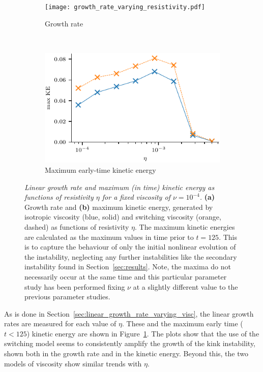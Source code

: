 \begin{figure}[t]
    \centering
    \begin{subfigure}[t]{0.5\textwidth}
      \texttt{[image: growth\_rate\_varying\_resistivity.pdf]}
      \caption{Growth rate}
    \end{subfigure}%
    ~
    \begin{subfigure}[t]{0.5\textwidth}
      \includegraphics[width=\textwidth]{max_kinetic_changing_resist.pdf}
      \caption{Maximum early-time kinetic energy}
    \end{subfigure}
    \caption{\textit{Linear growth rate and maximum (in time) kinetic energy as
        functions of resistivity $\eta$ for a fixed
          viscosity of $\nu=10^{-4}$.} \textbf{(a)} Growth rate and \textbf{(b)} maximum kinetic energy, generated by isotropic viscosity (blue, solid) and switching viscosity (orange, dashed) as functions of resistivity $\eta$. The maximum kinetic energies are calculated as the maximum values in time prior to $t=125$. This is to capture the behaviour of only the initial nonlinear evolution of the instability, neglecting any further instabilities like the secondary instability found in Section~\ref{sec:results}. Note, the maxima do not necessarily occur at the same time and this particular parameter study has been performed fixing $\nu$ at a slightly different value to the previous parameter studies.}
    \label{fig:growth_rate_varying_resistivity}
\end{figure}

As is done in Section~\ref{sec:linear_growth_rate_varying_visc}, the linear growth rates are measured for each value of $\eta$. These and the maximum early time ($t<125$) kinetic energy are shown in Figure~\ref{fig:growth_rate_varying_resistivity}. The plots show that the use of the switching model seems to consistently amplify the growth of the kink instability, shown both in the growth rate and in the kinetic energy. Beyond this, the two models of viscosity show similar trends with $\eta$.

